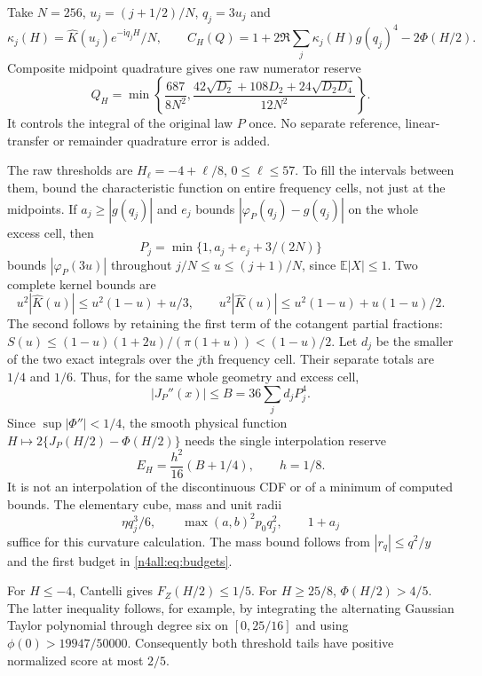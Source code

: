 \documentclass[11pt,a4paper]{article}
\numberwithin{equation}{section}
\theoremstyle{definition}
\theoremstyle{remark}
\newcommand{\E}{\mathbb E}
\newcommand{\ii}{\mathrm i}
\begin{document}
Take $N=256$, $u_j=(j+1/2)/N$, $q_j=3u_j$ and
\[
 \kappa_j(H)=\widehat K(u_j)e^{-\ii q_jH}/N,\qquad
 C_H(Q)=1+2\Re\sum_j\kappa_j(H)g(q_j)^4-2\Phi(H/2).
\]
Composite midpoint quadrature gives one raw numerator reserve
\begin{equation}\label{n4all:eq:midpoint}
 Q_H=\min\left\{\frac{687}{8N^2},
 \frac{42\sqrt{D_2}+108D_2+24\sqrt{D_2D_4}}{12N^2}\right\}.
\end{equation}
It controls the integral of the original law $P$ once. No separate
reference, linear-transfer or remainder quadrature error is added.

The raw thresholds are $H_\ell=-4+\ell/8$, $0\le\ell\le57$.
To fill the intervals between them, bound the characteristic function
on entire frequency cells, not just at the midpoints. If
$a_j\ge|g(q_j)|$ and $e_j$ bounds $|\varphi_P(q_j)-g(q_j)|$ on the
whole excess cell, then
\[
 P_j=\min\{1,a_j+e_j+3/(2N)\}
\]
bounds $|\varphi_P(3u)|$ throughout $j/N\le u\le(j+1)/N$,
since $\E|X|\le1$. Two complete kernel bounds are
\[
 u^2|\widehat K(u)|\le u^2(1-u)+u/3,\qquad
 u^2|\widehat K(u)|\le u^2(1-u)+u(1-u)/2.
\]
The second follows by retaining the first term of the cotangent
partial fractions:
$S(u)\le(1-u)(1+2u)/(\pi(1+u))<(1-u)/2$.
Let $d_j$ be the smaller of the two exact integrals over the $j$th
frequency cell. Their separate totals are $1/4$ and $1/6$.
Thus, for the same whole geometry and excess cell,
\[
 |J_P''(x)|\le B=36\sum_jd_jP_j^4.
\]
Since $\sup|\Phi''|<1/4$, the smooth physical function
$H\mapsto2\{J_P(H/2)-\Phi(H/2)\}$ needs the single interpolation
reserve
\begin{equation}\label{n4all:eq:H-reserve}
 E_H=\frac{h^2}{16}(B+1/4),\qquad h=1/8.
\end{equation}
It is not an interpolation of the discontinuous CDF or of a minimum
of computed bounds. The elementary cube, mass and unit radii
\[
 \eta q_j^3/6,\qquad \max(a,b)^2p_0q_j^2,\qquad 1+a_j
\]
suffice for this curvature calculation. The mass bound follows from
$|r_q|\le q^2/y$ and the first budget in
\eqref{n4all:eq:budgets}.

For $H\le-4$, Cantelli gives $F_Z(H/2)\le1/5$.
For $H\ge25/8$, $\Phi(H/2)>4/5$. The latter inequality follows,
for example, by integrating the alternating Gaussian Taylor
polynomial through degree six on $[0,25/16]$ and using
$\phi(0)>19947/50000$. Consequently both threshold tails have
positive normalized score at most $2/5$.
\end{document}
